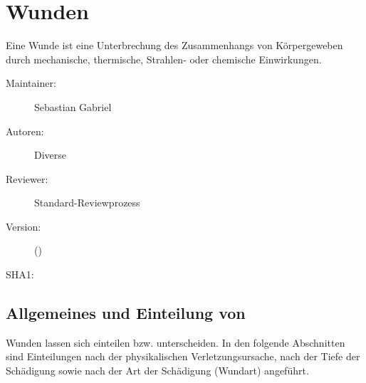 \def\ChapterCode{WUN}
% 
\chapter
[\CO{[WUN]} Wunden]
{Wunden}
\label{chp:WUN}

\ChapterIntro
{%
 Eine Wunde ist eine Unterbrechung des
Zusammenhangs von Körpergeweben durch mechanische,
thermische, Strahlen- oder chemische Einwirkungen.
}
{%
\begin{description}
  \item[Maintainer:] Sebastian Gabriel
  \item[Autoren:] Diverse
  \item[Reviewer:] Standard-Reviewprozess
  \item[Version:] {\VarDocVersionTypeName} ({\VarDocVersionTypeDescription})
  \item[SHA1:] {\DocGitCommit}
\end{description}

{\TxTeilkapitelAASS}
}


\clearpage




\section{Allgemeines und Einteilung von 
}

\Text
{{\TxBeschreibung}}%
{%
\label{topic:wunden-einteilung}%
\label{topic:wunden}%
%

Wunden lassen sich 
einteilen bzw. unterscheiden. In den folgende Abschnitten
sind Einteilungen nach der physikalischen
Verletzungsursache, nach der Tiefe der Schädigung sowie nach
der Art der Schädigung (Wundart) angeführt.
}%





